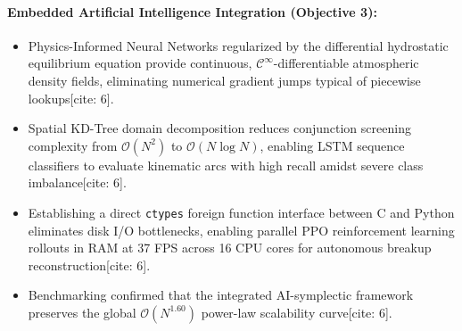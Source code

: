 \documentclass[12pt,letterpaper,twoside]{book}
\begin{document}
\paragraph{Embedded Artificial Intelligence Integration (Objective 3):}
\begin{itemize}
    \item Physics-Informed Neural Networks regularized by the differential hydrostatic equilibrium equation provide continuous, $\mathcal{C}^\infty$-differentiable atmospheric density fields, eliminating numerical gradient jumps typical of piecewise lookups[cite: 6].
    \item Spatial KD-Tree domain decomposition reduces conjunction screening complexity from $\mathcal{O}(N^2)$ to $\mathcal{O}(N \log N)$, enabling LSTM sequence classifiers to evaluate kinematic arcs with high recall amidst severe class imbalance[cite: 6].
    \item Establishing a direct \texttt{ctypes} foreign function interface between C and Python eliminates disk I/O bottlenecks, enabling parallel PPO reinforcement learning rollouts in RAM at 37 FPS across 16 CPU cores for autonomous breakup reconstruction[cite: 6].
    \item Benchmarking confirmed that the integrated AI-symplectic framework preserves the global $\mathcal{O}(N^{1.60})$ power-law scalability curve[cite: 6].
\end{itemize}
\end{document}

